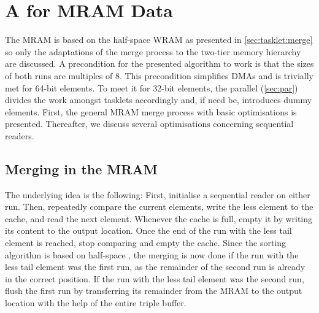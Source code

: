 \section{A \texorpdfstring{\MS{}}{MergeSort} for MRAM Data}
\label{sec:mram:merge}

The MRAM \MS{} is based on the half-space WRAM \MS{} as presented in \cref{sec:tasklet:merge} so only the adaptations of the merge process to the two-tier memory hierarchy are discussed.
A precondition for the presented algorithm to work is that the sizes of both runs are multiples of 8.
This precondition simplifies DMAs and is trivially met for 64-bit elements.
To meet it for 32-bit elements, the parallel \MS{} (\cref{sec:par}) divides the work amongst tasklets accordingly and, if need be, introduces dummy elements.
First, the general MRAM merge process with basic optimisations is presented.
Thereafter, we discuss several optimisations concerning sequential readers.


\subsection{Merging in the MRAM}

The underlying idea is the following:
First, initialise a sequential reader on either run.
Then, repeatedly compare the current elements, write the less element to the cache, and read the next element.
Whenever the cache is full, empty it by writing its content to the output location.
Once the end of the run with the less tail element is reached, stop comparing and empty the cache.
Since the sorting algorithm is based on half-space \MS{}, the merging is now done if the run with the less tail element was the first run, as the remainder of the second run is already in the correct position.
If the run with the less tail element was the second run, flush the first run by transferring its remainder from the MRAM to the output location with the help of the entire triple buffer.

